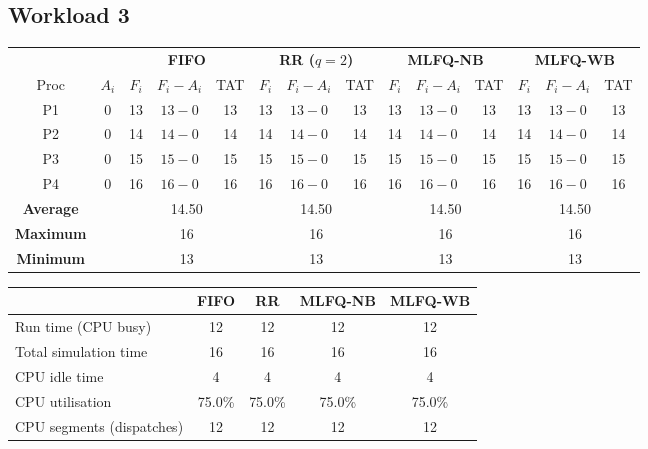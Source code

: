 \documentclass[11pt,a4paper]{article}
\begin{document}
\subsection{Workload 3}
\begin{center}\footnotesize\setlength{\tabcolsep}{4pt}
\begin{tabular}{cccccccccccccc}\toprule
& & \multicolumn{3}{c}{\textbf{FIFO}} & \multicolumn{3}{c}{\textbf{RR ($q=2$)}} & \multicolumn{3}{c}{\textbf{MLFQ-NB}} & \multicolumn{3}{c}{\textbf{MLFQ-WB}} \\
\cmidrule(lr){3-5}\cmidrule(lr){6-8}\cmidrule(lr){9-11}\cmidrule(lr){12-14}
Proc & $A_i$ & $F_i$ & $F_i-A_i$ & TAT & $F_i$ & $F_i-A_i$ & TAT & $F_i$ & $F_i-A_i$ & TAT & $F_i$ & $F_i-A_i$ & TAT \\\midrule
P1 & 0 & 13 & $13-0$ & 13 & 13 & $13-0$ & 13 & 13 & $13-0$ & 13 & 13 & $13-0$ & 13 \\
P2 & 0 & 14 & $14-0$ & 14 & 14 & $14-0$ & 14 & 14 & $14-0$ & 14 & 14 & $14-0$ & 14 \\
P3 & 0 & 15 & $15-0$ & 15 & 15 & $15-0$ & 15 & 15 & $15-0$ & 15 & 15 & $15-0$ & 15 \\
P4 & 0 & 16 & $16-0$ & 16 & 16 & $16-0$ & 16 & 16 & $16-0$ & 16 & 16 & $16-0$ & 16 \\
\midrule
\textbf{Average} & & \multicolumn{3}{c}{14.50} & \multicolumn{3}{c}{14.50} & \multicolumn{3}{c}{14.50} & \multicolumn{3}{c}{14.50} \\
\textbf{Maximum} & & \multicolumn{3}{c}{16} & \multicolumn{3}{c}{16} & \multicolumn{3}{c}{16} & \multicolumn{3}{c}{16} \\
\textbf{Minimum} & & \multicolumn{3}{c}{13} & \multicolumn{3}{c}{13} & \multicolumn{3}{c}{13} & \multicolumn{3}{c}{13} \\
\bottomrule\end{tabular}\end{center}
\begin{center}\footnotesize\begin{tabular}{lcccc}\toprule
& \textbf{FIFO} & \textbf{RR} & \textbf{MLFQ-NB} & \textbf{MLFQ-WB}\\\midrule
Run time (CPU busy) & 12 & 12 & 12 & 12 \\
Total simulation time & 16 & 16 & 16 & 16 \\
CPU idle time & 4 & 4 & 4 & 4 \\
CPU utilisation & 75.0\% & 75.0\% & 75.0\% & 75.0\% \\
CPU segments (dispatches) & 12 & 12 & 12 & 12 \\
\bottomrule\end{tabular}\end{center}
\end{document}
